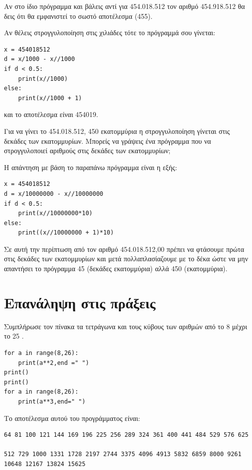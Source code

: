 \documentclass[b5paper,11pt,twoside,openleft]{memoir}
\begin{document}
Αν στο ίδιο πρόγραμμα και βάλεις αντί για 454.018.512 τον αριθμό 454.918.512 θα δεις ότι θα εμφανιστεί το σωστό αποτέλεσμα (455).

Αν θέλεις στρογγυλοποίηση στις χιλιάδες τότε το πρόγραμμά σου γίνεται:
\begin{lstlisting}
x = 454018512
d = x/1000 - x//1000
if d < 0.5:
    print(x//1000)
else:
    print(x//1000 + 1)
\end{lstlisting}
και το αποτέλεσμα είναι 454019.

\begin{exercise}
Για να γίνει το 454.018.512, 450 εκατομμύρια  η στρογγυλοποίηση γίνεται στις δεκάδες των εκατομμυρίων. Μπορείς να γράψεις ένα πρόγραμμα που να στρογγυλοποιεί αριθμούς στις δεκάδες των εκατομμυρίων;
\end{exercise}
Η απάντηση με βάση το παραπάνω πρόγραμμα είναι η εξής:
\begin{lstlisting}
x = 454018512
d = x/10000000 - x//10000000
if d < 0.5:
    print(x//10000000*10)
else:
    print((x//10000000 + 1)*10)
\end{lstlisting}
Σε αυτή την περίπτωση από τον αριθμό 454.018.512,00 πρέπει να φτάσουμε πρώτα στις δεκάδες των εκατομμυρίων και μετά πολλαπλασίαζουμε με το δέκα ώστε να μην απαντήσει το πρόγραμμα 45 (δεκάδες εκατομμύρια) αλλά 450 (εκατομμύρια).

\section{Επανάληψη στις πράξεις}
\begin{exercise}
Συμπλήρωσε τον πίνακα τα τετράγωνα και τους κύβους των αριθμών από το 8 μέχρι το 25 .
\end{exercise}
\begin{lstlisting}
for a in range(8,26):
    print(a**2,end =" ")
print()
print()
for a in range(8,26):
    print(a**3,end=" ")
\end{lstlisting}
Το αποτέλεσμα αυτού του προγράμματος είναι:

\begin{lstlisting}
64 81 100 121 144 169 196 225 256 289 324 361 400 441 484 529 576 625 

512 729 1000 1331 1728 2197 2744 3375 4096 4913 5832 6859 8000 9261 
10648 12167 13824 15625
\end{lstlisting}
\end{document}
